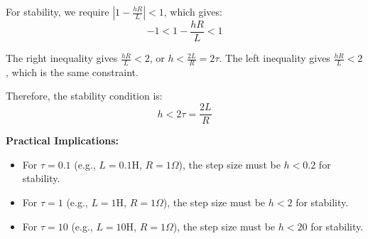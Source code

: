 \documentclass[12pt,a4paper]{report}
\begin{document}
For stability, we require $|1 - \frac{hR}{L}| < 1$, which gives:
\begin{equation}
-1 < 1 - \frac{hR}{L} < 1
\end{equation}

The right inequality gives $\frac{hR}{L} < 2$, or $h < \frac{2L}{R} = 2\tau$. The left inequality gives $\frac{hR}{L} < 2$, which is the same constraint.

Therefore, the stability condition is:
\begin{equation}
h < 2\tau = \frac{2L}{R}
\end{equation}

\textbf{Practical Implications:}
\begin{itemize}
    \item For $\tau = 0.1$ (e.g., $L = 0.1$H, $R = 1\Omega$), the step size must be $h < 0.2$ for stability.
    \item For $\tau = 1$ (e.g., $L = 1$H, $R = 1\Omega$), the step size must be $h < 2$ for stability.
    \item For $\tau = 10$ (e.g., $L = 10$H, $R = 1\Omega$), the step size must be $h < 20$ for stability.
\end{itemize}
\end{document}
